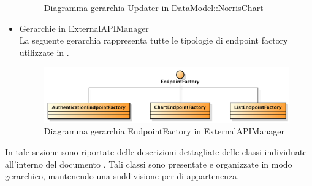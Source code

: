 \begin{itemize}
\begin{figure}[H]
	                \caption{Diagramma gerarchia Updater in DataModel::NorrisChart }
	            \end{figure}
			\item Gerarchie in ExternalAPIManager \\
				La seguente gerarchia rappresenta tutte le tipologie di endpoint factory utilizzate in .
				\begin{figure}[H]
	                \centering
	                \includegraphics[width=1\textwidth]{DefinizioneDiProdotto/Pics/Gerarchie/NorrisEndpointFactory.pdf}
	                \caption{Diagramma gerarchia EndpointFactory in ExternalAPIManager}
	            \end{figure}

		\end{itemize}
    	In tale sezione sono riportate delle descrizioni dettagliate delle classi individuate all'interno del documento . Tali classi sono presentate e organizzate in modo gerarchico, mantenendo una suddivisione per  di appartenenza.
        
        

